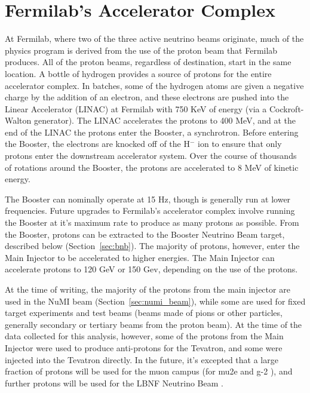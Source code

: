 \section{Fermilab's Accelerator Complex}

At Fermilab, where two of the three active neutrino beams originate, much of the physics program is derived from the use of the proton beam that Fermilab produces.  All of the proton beams, regardless of destination, start in the same location.  A bottle of hydrogen provides a source of protons for the entire accelerator complex.  In batches, some of the hydrogen atoms are given a negative charge by the addition of an electron, and these electrons are pushed into the Linear Accelerator (LINAC) at Fermilab with 750 KeV of energy (via a Cockroft-Walton generator).  The LINAC accelerates the protons to 400 MeV, and at the end of the LINAC the protons enter the Booster, a synchrotron.  Before entering the Booster, the electrons are knocked off of the H$^-$ ion to ensure that only protons enter the downstream accelerator system.  Over the course of thousands of rotations around the Booster, the protons are accelerated to 8 MeV of kinetic energy.

The Booster can nominally operate at 15 Hz, though is generally run at lower frequencies.  Future upgrades to Fermilab's accelerator complex involve running the Booster at it's maximum rate to produce as many protons as possible.  From the Booster, protons can be extracted to the Booster Neutrino Beam target, described below (Section~\ref{sec:bnb}).  The majority of protons, however, enter the Main Injector to be accelerated to higher energies.  The Main Injector can accelerate protons to 120 GeV or 150 Gev, depending on the use of the protons.

At the time of writing, the majority of the protons from the main injector are used in the NuMI beam (Section~\ref{sec:numi_beam}), while some are used for fixed target experiments and test beams (beams made of pions or other particles, generally secondary or tertiary beams from the proton beam).  At the time of the data collected for this analysis, however, some of the protons from the Main Injector were used to produce anti-protons for the Tevatron, and some were injected into the Tevatron directly.  In the future, it's excepted that a large fraction of protons will be used for the muon campus (for mu2e and g-2 \cite{Bartoszek:2014mya} \cite{Grange:2015fou}), and further protons will be used for the LBNF Neutrino Beam \cite{DUNE}.

